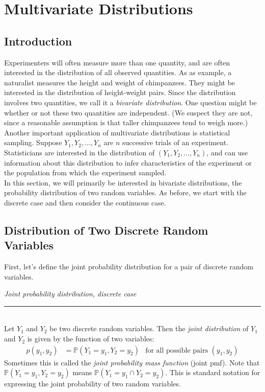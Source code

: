 \documentclass[12pt]{article}
\theoremstyle{definition}
\theoremstyle{remark}
\def\P{{\mathbb P}}
\begin{document}
\setcounter{section}{3}
\section{Multivariate Distributions}

\subsection{Introduction}
Experimenters will often measure more than one quantity, and are often interested in the distribution of all observed quantities. As as example, a naturalist measures the height and weight of chimpanzees. They might be interested in the distribution of height-weight pairs. Since the distribution involves two quantities, we call it a \emph{bivariate distribution}. One question might be whether or not these two quantities are independent. (We suspect they are not, since a reasonable assumption is that taller chimpanzees tend to weigh more.)\\

Another important application of multivariate distributions is statistical sampling. Suppose $Y_1, Y_2, \dots, Y_n$ are $n$ successive trials of an experiment. Statisticians are interested in the distribution of $(Y_1, Y_2, \dots, Y_n)$, and can use information about this distribution to infer characteristics of the experiment or the population from which the experiment sampled.\\

In this section, we will primarily be interested in bivariate distributions, the probability distribution of two random variables. As before, we start with the discrete case and then consider the continuous case.

\subsection{Distribution of Two Discrete Random Variables}
First, let's define the joint probability distribution for a pair of discrete random variables.

\begin{framed}
\emph{Joint probability distribution, discrete case}\\
  \rule{\dimexpr{}\fboxrule}{.1pt} \\
Let $Y_1$ and $Y_2$ be two discrete random variables. Then the \emph{joint distribution} of $Y_1$ and $Y_2$ is given by the function of two variables:
\begin{align*}
p(y_1, y_2) &= \P(Y_1 = y_1, Y_2 = y_2) & \text{for all possible pairs }(y_1, y_2)
\end{align*}
Sometimes this is called the \emph{joint probability mass function} (joint pmf). Note that $\P(Y_1 = y_1, Y_2 = y_2)$ means $\P(Y_1 = y_1 \cap Y_2 = y_2)$. This is standard notation for expressing the joint probability of two random variables. 
\end{framed}
\end{document}
